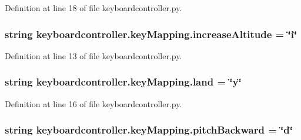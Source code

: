 Definition at line 18 of file keyboardcontroller.\-py.

\hypertarget{classkeyboardcontroller_1_1keyMapping_a7ef26c2eec93d9bf3124f0e360628dd7}{
\subsubsection[{increase\-Altitude}]{\setlength{\rightskip}{0pt plus 5cm}string keyboardcontroller.\-key\-Mapping.\-increase\-Altitude = \char`\"{}i\char`\"{}\hspace{0.3cm}{\ttfamily [static]}}}\label{classkeyboardcontroller_1_1keyMapping_a7ef26c2eec93d9bf3124f0e360628dd7}


Definition at line 13 of file keyboardcontroller.\-py.

\hypertarget{classkeyboardcontroller_1_1keyMapping_a63eed8388261cf53c15e26e4e67e1037}{
\subsubsection[{land}]{\setlength{\rightskip}{0pt plus 5cm}string keyboardcontroller.\-key\-Mapping.\-land = \char`\"{}y\char`\"{}\hspace{0.3cm}{\ttfamily [static]}}}\label{classkeyboardcontroller_1_1keyMapping_a63eed8388261cf53c15e26e4e67e1037}


Definition at line 16 of file keyboardcontroller.\-py.

\hypertarget{classkeyboardcontroller_1_1keyMapping_ac4ef085e346792c599629fcca0f5fc71}{
\subsubsection[{pitch\-Backward}]{\setlength{\rightskip}{0pt plus 5cm}string keyboardcontroller.\-key\-Mapping.\-pitch\-Backward = \char`\"{}d\char`\"{}\hspace{0.3cm}{\ttfamily [static]}}}\label{classkeyboardcontroller_1_1keyMapping_ac4ef085e346792c599629fcca0f5fc71}


